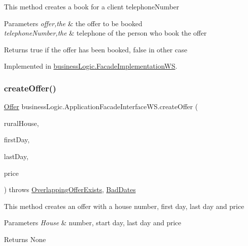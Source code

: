 This method creates a book for a client telephone\+Number


\begin{DoxyParams}{Parameters}
{\em offer,the} & the offer to be booked \\
\hline
{\em telephone\+Number,the} & telephone of the person who book the offer \\
\hline
\end{DoxyParams}
\begin{DoxyReturn}{Returns}
true if the offer has been booked, false in other case 
\end{DoxyReturn}


Implemented in \mbox{\hyperlink{classbusiness_logic_1_1_facade_implementation_w_s_a89aa08f9fe033c295d7fcf0cb5571882}{business\+Logic.\+Facade\+Implementation\+WS}}.

\mbox{\label{interfacebusiness_logic_1_1_application_facade_interface_w_s_a0e8d2135ef1384a32e74f60bcea55f09}} 
\subsubsection{\texorpdfstring{createOffer()}{createOffer()}}
{\footnotesize\ttfamily \mbox{\hyperlink{classdomain_1_1_offer}{Offer}} business\+Logic.\+Application\+Facade\+Interface\+W\+S.\+create\+Offer (\begin{DoxyParamCaption}\item[{\mbox{\hyperlink{classdomain_1_1_rural_house}{Rural\+House}}}]{rural\+House,  }\item[{Date}]{first\+Day,  }\item[{Date}]{last\+Day,  }\item[{float}]{price }\end{DoxyParamCaption}) throws \mbox{\hyperlink{classexceptions_1_1_overlapping_offer_exists}{Overlapping\+Offer\+Exists}}, \mbox{\hyperlink{classexceptions_1_1_bad_dates}{Bad\+Dates}}}

This method creates an offer with a house number, first day, last day and price


\begin{DoxyParams}{Parameters}
{\em House} & number, start day, last day and price \\
\hline
\end{DoxyParams}
\begin{DoxyReturn}{Returns}
None 
\end{DoxyReturn}



